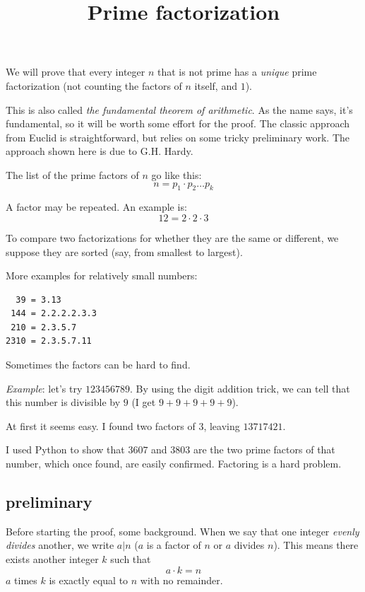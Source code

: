 \documentclass[11pt, oneside]{article}
\title{Prime factorization}
\date{}
\begin{document}
\maketitle
\Large


We will prove that every integer $n$ that is not prime has a \emph{unique} prime factorization (not counting the factors of $n$ itself, and $1$).  

This is also called \emph{the fundamental theorem of arithmetic}.  As the name says, it's fundamental, so it will be worth some effort for the proof.  The classic approach from Euclid is straightforward, but relies on some tricky preliminary work.  The approach shown here is due to G.H. Hardy.

The list of the prime factors of $n$ go like this:
\[ n = p_1 \cdot p_2 \dots p_k \]

A factor may be repeated.  An example is:
\[ 12 = 2 \cdot 2 \cdot 3 \]

To compare two factorizations for whether they are the same or different, we suppose they are sorted (say, from smallest to largest).

More examples for relatively small numbers:
\begin{verbatim}
  39 = 3.13
 144 = 2.2.2.2.3.3
 210 = 2.3.5.7
2310 = 2.3.5.7.11
\end{verbatim}

Sometimes the factors can be hard to find.

\emph{Example}:  let's try $123456789$.  By using the digit addition trick, we can tell that this number is divisible by $9$ (I get $9 + 9 + 9 + 9 + 9$).

At first it seems easy.  I found two factors of $3$, leaving $13717421$.

I used Python to show that $3607$ and $3803$ are the two prime factors of that number, which once found, are easily confirmed.  Factoring is a hard problem.

\subsection*{preliminary}

Before starting the proof, some background.  When we say that one integer \emph{evenly divides} another, we write $a|n$ ($a$ is a factor of $n$ or $a$ divides $n$).  This means there exists another integer $k$ such that
\[ a \cdot k = n \]
$a$ times $k$ is exactly equal to $n$ with no remainder.
\end{document}
